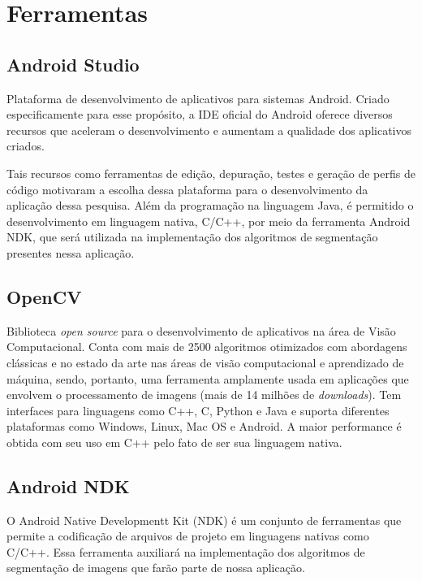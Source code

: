 \chapter{Ferramentas}\label{cap:ferramentas}

\section{Android Studio}
Plataforma de desenvolvimento de aplicativos para sistemas Android. Criado especificamente para esse propósito, a IDE oficial do Android oferece diversos recursos que aceleram o desenvolvimento e aumentam a qualidade dos aplicativos criados.

Tais recursos como ferramentas de edição, depuração, testes e geração de perfis de código motivaram a escolha dessa plataforma para o desenvolvimento da aplicação dessa pesquisa. Além da programação na linguagem Java, é permitido o desenvolvimento em linguagem nativa, C/C++, por meio da ferramenta Android NDK, que será utilizada na implementação dos algoritmos de segmentação presentes nessa aplicação\citep{androidstudio}.

\section{OpenCV}\label{sec:opencv}
Biblioteca \textit{open source} para o desenvolvimento de aplicativos na área de Visão Computacional. Conta com mais de 2500 algoritmos otimizados com abordagens clássicas e no estado da arte nas áreas de visão computacional e aprendizado de máquina, sendo, portanto, uma ferramenta amplamente usada em aplicações que envolvem o processamento de imagens (mais de 14 milhões de \textit{downloads}). Tem interfaces para linguagens como C++, C, Python e Java e suporta diferentes plataformas como Windows, Linux, Mac OS e Android. A maior performance é obtida com seu uso em C++ pelo fato de ser sua linguagem nativa.\citep{opencv}

\section{Android NDK}
O Android Native Developmentt Kit (NDK) é um conjunto de ferramentas que permite a codificação de arquivos de projeto em linguagens nativas como C/C++. Essa ferramenta auxiliará na implementação dos algoritmos de segmentação de imagens que farão parte de nossa aplicação.\citep{ndk}